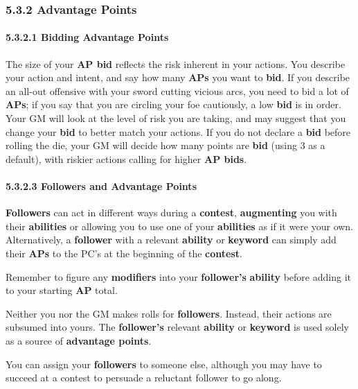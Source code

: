\documentclass[
]{article}
\begin{document}
\hypertarget{advantage-points}{%
\subsubsection{5.3.2 Advantage Points}\label{advantage-points}}

\hypertarget{bidding-advantage-points}{%
\paragraph{5.3.2.1 Bidding Advantage
Points}\label{bidding-advantage-points}}

The size of your \textbf{AP bid} reflects the risk inherent in your
actions. You describe your action and intent, and say how many
\textbf{APs} you want to \textbf{bid}. If you describe an all-out
offensive with your sword cutting vicious arcs, you need to bid a lot of
\textbf{APs}; if you say that you are circling your foe cautiously, a
low \textbf{bid} is in order. Your GM will look at the level of risk you
are taking, and may suggest that you change your \textbf{bid} to better
match your actions. If you do not declare a \textbf{bid} before rolling
the die, your GM will decide how many points are \textbf{bid} (using 3
as a default), with riskier actions calling for higher \textbf{AP bids}.

\hypertarget{followers-and-advantage-points}{%
\paragraph{5.3.2.3 Followers and Advantage
Points}\label{followers-and-advantage-points}}

\textbf{Followers} can act in different ways during a \textbf{contest},
\textbf{augmenting} you with their \textbf{abilities} or allowing you to
use one of your \textbf{abilities} as if it were your own.
Alternatively, a \textbf{follower} with a relevant \textbf{ability} or
\textbf{keyword} can simply add their \textbf{APs} to the PC's at the
beginning of the \textbf{contest}.

Remember to figure any \textbf{modifiers} into your \textbf{follower's}
\textbf{ability} before adding it to your starting \textbf{AP} total.

Neither you nor the GM makes rolls for \textbf{followers}. Instead,
their actions are subsumed into yours. The \textbf{follower's} relevant
\textbf{ability} or \textbf{keyword} is used solely as a source of
\textbf{advantage points}.

You can assign your \textbf{followers} to someone else, although you may
have to succeed at a contest to persuade a reluctant follower to go
along.
\end{document}
